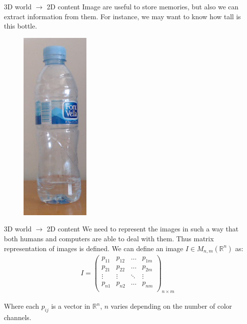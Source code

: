 \begin{frame}{\secname}{3D world $\rightarrow$ 2D content}
    Image are useful to store memories, but also we can extract information from them. For instance, we may want to know how tall is this bottle.
    \begin{figure}
        \centering
        \includegraphics[height=0.5\textheight]{img/agua.png}
    \end{figure}
\end{frame}

\begin{frame}{\secname}{3D world $\rightarrow$ 2D content}
    We need to represent the images in such a way that both humans and computers are able to deal with them. Thus matrix representation of images is defined. We can define an image $I \in M_{n,m}\left(\mathbb{R}^n\right)$ as:
    \begin{gather*}
        I = \begin{pmatrix}
            p_{11} & p_{12} & \dots & p_{1m} \\
            p_{21} & p_{22} & \dots & p_{2m} \\
            \vdots & \vdots & \ddots & \vdots \\
            p_{n1} & p_{n2} & \dots & p_{nm} \\
        \end{pmatrix}_{n \times m}
    \end{gather*}
    
    Where each $p_{ij}$ is a vector in $\mathbb{R}^n$, $n$ varies depending on the number of color channels.
\end{frame}

